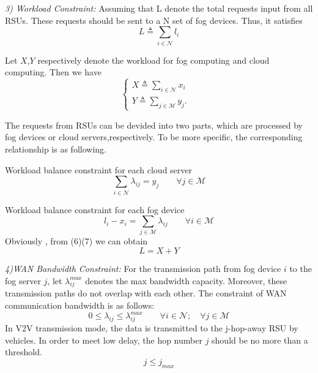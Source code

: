 \documentclass[twoside,twocolumn]{article}
\begin{document}
\textit{3) Workload Constraint:} Assuming that L denote the total requests input from all RSUs. These requests should be sent to a N set of fog devices. Thus, it satisfies 
$$
L \triangleq \sum_{i \in \mathcal{N}} l_i
$$

Let $\mathit{X}$,$\mathit{Y}$ respectively denote the workload for fog computing and cloud computing. Then we have
$$
\left\{
\begin{array}{lr}
\mathit{X} \triangleq \sum_{i \in \mathcal{N}} x_i &  \\
\mathit{Y} \triangleq \sum_{j \in \mathcal{M}} y_j. &
\end{array}
\right.
$$

The requests from RSUs can be devided into two parts, which are processed by fog devices or cloud servers,respectively. To be more specific, the corresponding relationship is as following.

Workload balance constraint for each cloud server
\begin{equation}
\sum_{i \in \mathcal{N}} \lambda_{ij} = y_j \qquad \forall j \in \mathcal{M}
\end{equation}

Workload balance constraint for each fog device
\begin{equation}
l_i - x_i = \sum_{j \in \mathcal{M}} \lambda_{ij} \qquad \forall i \in \mathcal{M}
\end{equation}
Obviously , from (6)(7) we can obtain 
\begin{equation}
L = X+Y
\end{equation}

\textit{4)WAN Bandwidth Constraint:} For the transmission path from fog device $i$ to the fog server $j$, let $\lambda_{ij}^{max}$ denotes the max bandwidth capacity. Moreover, these transmission paths do not overlap with each other. The constraint of WAN communication bandwidth is as follows:
\begin{equation}
0 \leq \lambda_{ij} \leq \lambda_{ij}^{max} \qquad \forall i \in \mathcal{N}; \quad \forall j \in \mathcal{M}
\end{equation}
In V2V transmission mode, the data is transmitted to the j-hop-away RSU by vehicles. In order to meet low delay, the hop number $j$ should be no more than a threshold.
\begin{equation}
j \leqslant j_{max}
\end{equation}
\end{document}
